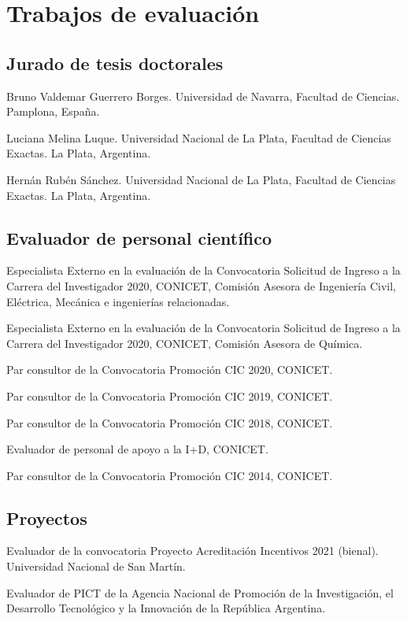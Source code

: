 \section{Trabajos de evaluación}

\subsection{Jurado de tesis doctorales}
 Bruno Valdemar Guerrero Borges. Universidad de Navarra, Facultad de Ciencias. Pamplona, España.

 Luciana Melina Luque. Universidad Nacional de La Plata, Facultad de Ciencias Exactas. La Plata, Argentina.

 Hernán Rubén Sánchez. Universidad Nacional de La Plata, Facultad de Ciencias Exactas. La Plata, Argentina.

\subsection{Evaluador de personal científico}

 Especialista Externo en la evaluación de la Convocatoria Solicitud de Ingreso a la Carrera del Investigador 2020, CONICET,
 Comisión Asesora de Ingeniería Civil, Eléctrica, Mecánica e ingenierías relacionadas.

 Especialista Externo en la evaluación de la Convocatoria Solicitud de Ingreso a la Carrera del Investigador 2020, CONICET, 
Comisión Asesora de Química.

 Par consultor de la Convocatoria Promoción CIC 2020, CONICET.

 Par consultor de la Convocatoria Promoción CIC 2019, CONICET.

 Par consultor de la Convocatoria Promoción CIC 2018, CONICET.

 Evaluador de personal de apoyo a la I+D, CONICET.

 Par consultor de la Convocatoria Promoción CIC 2014, CONICET.

\subsection{Proyectos}
 Evaluador de la convocatoria Proyecto Acreditación Incentivos 2021 (bienal). Universidad Nacional de San Martín.

 Evaluador de PICT de la Agencia Nacional de Promoción de la Investigación, el Desarrollo Tecnológico y la Innovación de la República Argentina.

